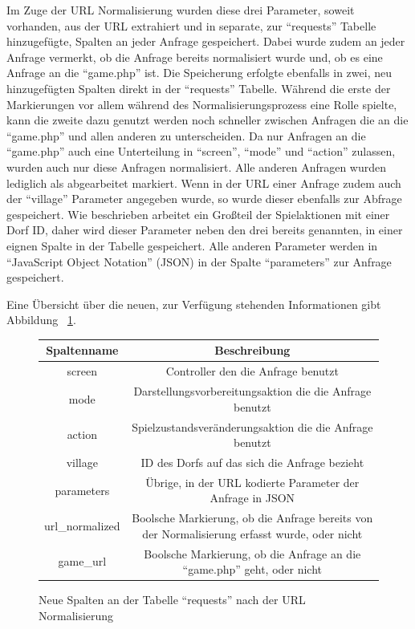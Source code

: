 \documentclass[10pt]{scrartcl}
\begin{document}
Im Zuge der URL Normalisierung wurden diese drei Parameter, soweit vorhanden, aus der URL extrahiert und in separate, zur ``requests'' Tabelle hinzugefügte, Spalten an jeder Anfrage gespeichert. Dabei wurde zudem an jeder Anfrage vermerkt, ob die Anfrage bereits normalisiert wurde und, ob es eine Anfrage an die ``game.php'' ist. Die Speicherung erfolgte ebenfalls in zwei, neu hinzugefügten Spalten direkt in der ``requests'' Tabelle. Während die erste der Markierungen vor allem während des Normalisierungsprozess eine Rolle spielte, kann die zweite dazu genutzt werden noch schneller zwischen Anfragen die an die ``game.php'' und allen anderen zu unterscheiden. Da nur Anfragen an die ``game.php'' auch eine Unterteilung in ``screen'', ``mode'' und ``action'' zulassen, wurden auch nur diese Anfragen normalisiert. Alle anderen Anfragen wurden lediglich als abgearbeitet markiert. Wenn in der URL einer Anfrage zudem auch der ``village'' Parameter angegeben wurde, so wurde dieser ebenfalls zur Abfrage gespeichert. Wie beschrieben arbeitet ein Großteil der Spielaktionen mit einer Dorf ID, daher wird dieser Parameter neben den drei bereits genannten, in einer eignen Spalte in der Tabelle gespeichert. Alle anderen Parameter werden in ``JavaScript Object Notation'' (JSON) in der Spalte ``parameters'' zur Anfrage gespeichert.

Eine Übersicht über die neuen, zur Verfügung stehenden Informationen gibt Abbildung ~\ref{fig:new_requests_columns_after_url_normalization}.

  \begin{figure}[htbp]
    \centering
    \begin{tabular}{|c|c|}
      \hline
      Spaltenname & Beschreibung \\
      \hline
      screen & Controller den die Anfrage benutzt\\
      \hline
      mode & Darstellungsvorbereitungsaktion die die Anfrage benutzt\\
      \hline
      action & Spielzustandsveränderungsaktion die die Anfrage benutzt\\
      \hline
      village & ID des Dorfs auf das sich die Anfrage bezieht\\
      \hline
      parameters & Übrige, in der URL kodierte Parameter der Anfrage in JSON\\
      \hline
      url\_normalized & Boolsche Markierung, ob die Anfrage bereits von der Normalisierung erfasst wurde, oder nicht\\
      \hline
      game\_url & Boolsche Markierung, ob die Anfrage an die ``game.php'' geht, oder nicht\\
      \hline
      
    \end{tabular}
    \caption{Neue Spalten an der Tabelle ``requests'' nach der URL Normalisierung}
    
    \label{fig:new_requests_columns_after_url_normalization}
  \end{figure}
  
\end{document}
